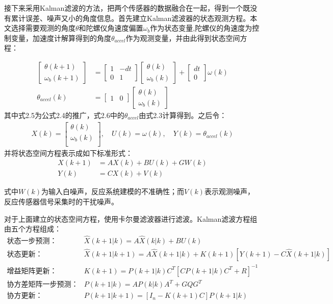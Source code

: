 接下来采用Kalman滤波的方法，把两个传感器的数据融合在一起，得到一个既没有累计误差、噪声又小的角度信息。首先建立Kalman滤波器的状态观测方程。本文选择需要观测的角度$\theta$和陀螺仪角速度偏置$\omega_b$作为状态变量,陀螺仪的角速度为控制变量，加速度计解算得到的角度$\theta_{accel}$作为观测变量，并由此得到状态空间方程：

\begin{align}
\begin{bmatrix} \theta(k+1)  \\ \omega_b(k+1)   \end{bmatrix} &= \begin{bmatrix} 1 & -dt \\ 0 & 1   \end{bmatrix}\begin{bmatrix} \theta(k)  \\ \omega_b(k) \end{bmatrix} + \begin{bmatrix} dt \\ 0  \end{bmatrix} \omega(k) \\
\theta_{accel}(k) &=\begin{bmatrix} 1 & 0  \end{bmatrix}  \begin{bmatrix} \theta(k) \\ \omega_b(k)  \end{bmatrix}
\end{align}
其中式2.5为公式2.4的推广，式2.6中的$\theta_{accel}$由式2.3计算得到。之后令：
\begin{align}
X(k) = \begin{bmatrix} \theta(k)  \\ \omega_{b}(k) \\  \end{bmatrix}, \quad U(k) = \omega(k), \quad Y(k) = \theta_{accel}(k)
\end{align}
并将状态空间方程表示成如下标准形式：
\begin{align}
X(k+1) &= A X(k) + B U(k) + G W(k) \\
Y(k) &= C X(k) + V(k)
\end{align}

式中$W(k)$为输入白噪声，反应系统建模的不准确性；而$V(k)$表示观测噪声，反应传感器信号采集时的干扰噪声。

对于上面建立的状态空间方程，使用卡尔曼滤波器进行滤波。Kalman滤波方程组由五个方程组成：
\begin{align}
    状态一步预测： & \hat{X}(k+1|k) = A \hat{X}(k|k) + B U(k) \\
    状态更新：& \hat{X}(k+1|k+1) = A \hat{X}(k+1|k) + K(k+1)[Y(k+1)-C\hat{X}(k+1|k)] \\
    增益矩阵更新：& K(k+1) = P(k+1|k)C^T[CP(k+1|k)C^T + R]^{-1} \\
    协方差矩阵一步预测：& P(k+1|k) = AP(k|k)A^T+GQG^T \\
    协方更新：& P(k+1|k+1) = [I_n-K(k+1)C]P(k+1|k)
\end{align}

